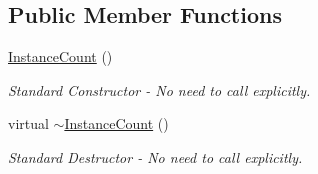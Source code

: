 \subsection*{Public Member Functions}
\begin{DoxyCompactItemize}
\item 
\hyperlink{struct_d_d4hep_1_1_instance_count_aa543483ba37302ae1a2059eceb12c798}{Instance\+Count} ()
\begin{DoxyCompactList}\small\item\em Standard Constructor -\/ No need to call explicitly. \end{DoxyCompactList}\item 
virtual \hyperlink{struct_d_d4hep_1_1_instance_count_a7d9ff65ecca8d6024f7275ea93058ad7}{$\sim$\+Instance\+Count} ()
\begin{DoxyCompactList}\small\item\em Standard Destructor -\/ No need to call explicitly. \end{DoxyCompactList}\end{DoxyCompactItemize}
